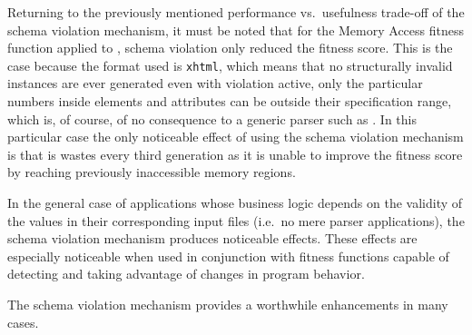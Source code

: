 Returning to the previously mentioned performance vs.\ usefulness trade-off of the schema violation
mechanism, it must be noted that for the Memory Access fitness function applied to \libxml, schema
violation only reduced the fitness score. This is the case because the format used is \texttt{xhtml}, which
means that no structurally invalid instances are ever generated even with violation active, only the
particular numbers inside \xml elements and attributes can be outside their specification range, which is, of
course, of no consequence to a generic \xml parser such as \libxml. In this particular case the only
noticeable effect of using the schema violation mechanism is that is wastes every third generation as it is
unable to improve the fitness score by reaching previously inaccessible memory regions.

In the general case of applications whose business logic depends on the validity of the values in their
corresponding input files (i.e.\ no mere parser applications), the schema violation mechanism produces
noticeable effects. These effects are especially noticeable when used in conjunction with fitness functions
capable of detecting and taking advantage of changes in program behavior.

\begin{mdframed}
The schema violation mechanism provides a worthwhile enhancements in many cases.
\end{mdframed}

